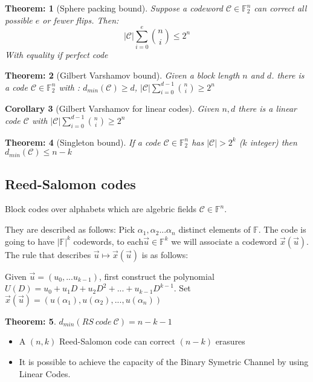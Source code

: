 \documentclass[11pt, a4paper]{scrartcl}
\newtheorem{theorem}{Theorem:}[section]
\newtheorem{corollary}[theorem]{Corollary}
\begin{document}
\begin{theorem}[Sphere packing bound] Suppose a codeword $\mathcal C \in \mathbb F_2^n$ can correct all possible $e$ or fewer flips. Then: $$|\mathcal C| \sum_{i=0}^e \binom ni \leq 2^n $$
With equality if perfect code
\end{theorem}

\begin{theorem}[Gilbert Varshamov bound] Given a block length $n$ and $d$. there is a code  $\mathcal C \in \mathbb F_2^n$ with : $d_{min} (\mathcal C)\geq d$, $|\mathcal C| \sum_{i=0}^{d-1} \binom ni \geq 2^n $
\end{theorem}

\begin{corollary}[Gilbert Varshamov for linear codes] Given $n,d$ there is a linear code $\mathcal C$ with $|\mathcal C| \sum_{i=0}^{d-1} \binom ni \geq 2^n $
\end{corollary}

\begin{theorem}[Singleton bound] If a code $\mathcal C \in \mathbb F_2^n$ has $|\mathcal C| > 2^k $ ($k$ integer) then $d_{min}(\mathcal C) \leq n-k$
\end{theorem}

\subsection{Reed-Salomon codes}
Block codes over alphabets which are algebric fields  $\mathcal C \in \mathbb F^n$. 

They are described as follows: Pick $\alpha_1, \alpha_2... \alpha_n$ distinct elements of $ \mathbb F$. The code is going to have $| \mathbb F|^k$ codewords, to each$\vec u \in  \mathbb F^k$ we will associate a codeword $\vec x(\vec u)$. The rule that describes $\vec u \mapsto \vec x(\vec u)$ is as follows: 

Given $\vec u = (u_0, ...  u_{k-1})$, first construct the polynomial $U(D) = u_0 +u_1D+u_2D^2 +...+u_{k-1}D^{k-1}$. Set $\vec x(\vec u) = (u(\alpha_1), u(\alpha_2),..., u(\alpha_n))$

\begin{theorem}
$d_{min}(RS\ code\ \mathcal C) = n-k-1$ 
\end{theorem}

\begin{itemize}
\item A $(n,k)$ Reed-Salomon code can correct $(n-k)$ erasures
\item It is possible to achieve the capacity of the Binary Symetric Channel by using Linear Codes. 
\end{itemize}
\end{document}
